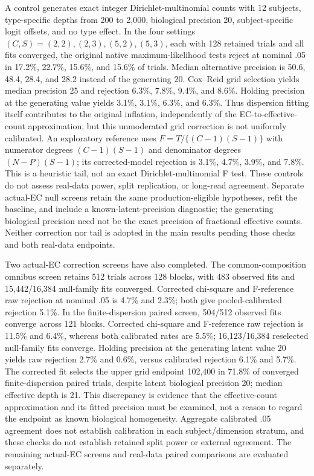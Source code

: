 \documentclass[11pt]{article}
\begin{document}
A control generates exact integer Dirichlet-multinomial counts with 12 subjects, type-specific depths from 200 to 2,000, biological precision 20, subject-specific logit offsets, and no type effect. In the four settings \((C,S)=(2,2),(2,3),(5,2),(5,3)\), each with 128 retained trials and all fits converged, the original native maximum-likelihood tests reject at nominal .05 in 17.2\%, 22.7\%, 15.6\%, and 15.6\% of trials. Median alternative precision is 50.6, 48.4, 28.4, and 28.2 instead of the generating 20. Cox--Reid grid selection yields median precision 25 and rejection 6.3\%, 7.8\%, 9.4\%, and 8.6\%. Holding precision at the generating value yields 3.1\%, 3.1\%, 6.3\%, and 6.3\%. Thus dispersion fitting itself contributes to the original inflation, independently of the EC-to-effective-count approximation, but this unmoderated grid correction is not uniformly calibrated. An exploratory reference uses \(F=T/\{(C-1)(S-1)\}\) with numerator degrees \((C-1)(S-1)\) and denominator degrees \((N-P)(S-1)\); its corrected-model rejection is 3.1\%, 4.7\%, 3.9\%, and 7.8\%. This is a heuristic tail, not an exact Dirichlet-multinomial F test. These controls do not assess real-data power, split replication, or long-read agreement. Separate actual-EC null screens retain the same production-eligible hypotheses, refit the baseline, and include a known-latent-precision diagnostic; the generating biological precision need not be the exact precision of fractional effective counts. Neither correction nor tail is adopted in the main results pending those checks and both real-data endpoints.

Two actual-EC correction screens have also completed. The common-composition omnibus screen retains 512 trials across 128 blocks, with 483 observed fits and 15,442/16,384 null-family fits converged. Corrected chi-square and F-reference raw rejection at nominal .05 is 4.7\% and 2.3\%; both give pooled-calibrated rejection 5.1\%. In the finite-dispersion paired screen, 504/512 observed fits converge across 121 blocks. Corrected chi-square and F-reference raw rejection is 11.5\% and 6.4\%, whereas both calibrated rates are 5.5\%; 16,123/16,384 reselected null-family fits converge. Holding precision at the generating latent value 20 yields raw rejection 2.7\% and 0.6\%, versus calibrated rejection 6.1\% and 5.7\%. The corrected fit selects the upper grid endpoint 102,400 in 71.8\% of converged finite-dispersion paired trials, despite latent biological precision 20; median effective depth is 21. This discrepancy is evidence that the effective-count approximation and its fitted precision must be examined, not a reason to regard the endpoint as known biological homogeneity. Aggregate calibrated .05 agreement does not establish calibration in each subject/dimension stratum, and these checks do not establish retained split power or external agreement. The remaining actual-EC screens and real-data paired comparisons are evaluated separately.
\end{document}
